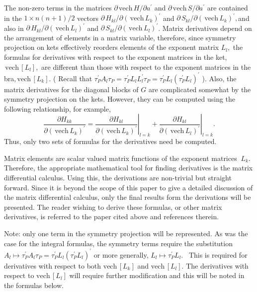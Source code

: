 \documentclass[12pt]{article}
\begin{document}
The non-zero terms in the matrices $\partial\,\mathrm{vech}\,H/\partial
a^{\prime}$ and $\partial\,\mathrm{vech}\,S/\partial a^{\prime}$ are contained
in the $1\times n\left(  n+1\right)  /2$ vectors $\partial\,H_{kl}%
/\partial\left(  \,\mathrm{vech}\,L_{k}\right)  ^{\prime}$ and $\partial
\,S_{kl}/\partial\left(  \,\mathrm{vech}\,L_{k}\right)  ^{\prime},$and also in
$\partial\,H_{kl}/\partial\left(  \,\mathrm{vech}\,L_{l}\right)  ^{\prime}$
and $\partial\,S_{kl}/\partial\left(  \,\mathrm{vech}\,L_{l}\right)  ^{\prime
}$. Matrix derivatives depend on the arrangement of elements in a matrix
variable, therefore, since symmetry projection on kets effectively reorders
elements of the exponent matrix $L_{l},$ the formulas for derivatives with
respect to the exponent matrices in the ket, $\,\mathrm{vech}\,\left[
L_{l}\right]  ,$ are different than those with respect to the exponent
matrices in the bra,$\,\mathrm{vech}\,\left[  L_{k}\right]  $. ( Recall that
$\tau_{P}^{\prime}A_{l}\tau_{P}=\tau_{P}^{\prime}L_{l}L_{l}^{\prime}\tau
_{P}=\tau_{P}^{\prime}L_{l}\left(  \tau_{P}^{\prime}L_{l}\right)  ^{\prime}$
). Also, the matrix derivatives for the diagonal blocks of $G$ are complicated
somewhat by the symmetry projection on the kets. However, they can be computed
using the following relationship, for example,
\begin{equation}
\frac{\partial H_{kk}}{\partial\left(  \,\mathrm{vech}\,L_{k}\right)
^{\prime}}=\left.  \frac{\partial H_{kl}}{\partial\left(  \,\mathrm{vech}%
\,L_{k}\right)  ^{\prime}}\right|  _{l=k}+\left.  \frac{\partial H_{kl}%
}{\partial\left(  \,\mathrm{vech}\,L_{l}\right)  ^{\prime}}\right|  _{l=k}.
\end{equation}
Thus, only two sets of formulas for the derivatives need be computed.

Matrix elements are scalar valued matrix functions of the exponent matrices
$\ L_{k}.$ Therefore, the appropriate mathematical tool for finding
derivatives is the matrix differential calculus\cite{Kinghorn95a}. Using this,
the derivations are non-trivial but straight forward. Since it is beyond the
scope of this paper to give a detailed discussion of the matrix differential
calculus, only the final results form the derivations will be presented. The
reader wishing to derive these formulas, or other matrix derivatives, is
referred to the paper cited above and references therein.

Note: only one term in the symmetry projection will be represented. As was the
case for the integral formulas, the symmetry terms require the substitution
$A_{l}\mapsto\tau_{P}^{\prime}A_{l}\tau_{P}=\tau_{P}^{\prime}L_{l}\left(
\tau_{P}^{\prime}L_{l}\right)  ^{\prime}$ or more generally, $L_{l}\mapsto
\tau_{P}^{\prime}L_{l}.$ \ This is required for derivatives with respect to
both $\mathrm{vech}\,\left[  L_{k}\right]  $ and $\mathrm{vech}\,\left[
L_{l}\right]  .$ The derivatives with respect to $\mathrm{vech}\,\left[
L_{l}\right]  $ will require further modification and this will be noted in
the formulas below.
\end{document}
